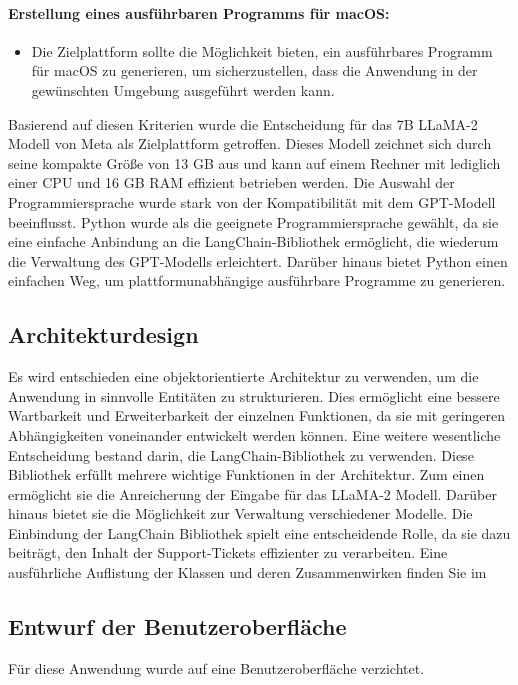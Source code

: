 \paragraph{Erstellung eines ausführbaren Programms für macOS:} 
\begin{itemize}
	\item Die Zielplattform sollte die Möglichkeit bieten, ein ausführbares Programm für macOS zu generieren, um sicherzustellen, dass die Anwendung in der gewünschten Umgebung ausgeführt werden kann.
\end{itemize}

Basierend auf diesen Kriterien wurde die Entscheidung für das 7B \ac{LLaMA}-2 Modell
von Meta als Zielplattform getroffen. Dieses Modell zeichnet sich durch seine 
kompakte Größe von 13 \ac{GB} aus und kann auf einem Rechner mit lediglich einer \ac{CPU}
und 16 \ac{GB} \ac{RAM} effizient betrieben werden.
Die Auswahl der Programmiersprache wurde stark von der Kompatibilität mit dem \ac{GPT}-Modell 
beeinflusst. Python wurde als die geeignete Programmiersprache gewählt, da sie eine 
einfache Anbindung an die LangChain-Bibliothek ermöglicht, die wiederum die Verwaltung
des \ac{GPT}-Modells erleichtert. Darüber hinaus bietet Python einen einfachen Weg, um 
plattformunabhängige ausführbare Programme zu generieren.


\subsection{Architekturdesign}
\label{sec:Architekturdesign}
Es wird entschieden eine objektorientierte
Architektur zu verwenden, um die Anwendung in sinnvolle Entitäten zu strukturieren.
Dies ermöglicht eine bessere Wartbarkeit und Erweiterbarkeit der einzelnen Funktionen,
da sie mit geringeren Abhängigkeiten voneinander entwickelt werden können.
Eine weitere wesentliche Entscheidung bestand darin, die LangChain-Bibliothek zu verwenden.
Diese Bibliothek erfüllt mehrere wichtige Funktionen in der Architektur. 
Zum einen ermöglicht sie die Anreicherung der Eingabe für das \ac{LLaMA}-2 Modell.
Darüber hinaus bietet sie die Möglichkeit zur Verwaltung verschiedener Modelle. 
Die Einbindung der LangChain Bibliothek spielt eine entscheidende Rolle, da sie dazu beiträgt, 
den Inhalt der Support-Tickets effizienter zu verarbeiten.
Eine ausführliche Auflistung der Klassen und deren Zusammenwirken finden Sie im 


\subsection{Entwurf der Benutzeroberfläche}
\label{sec:Benutzeroberflaeche} 
Für diese Anwendung wurde auf eine Benutzeroberfläche verzichtet.


